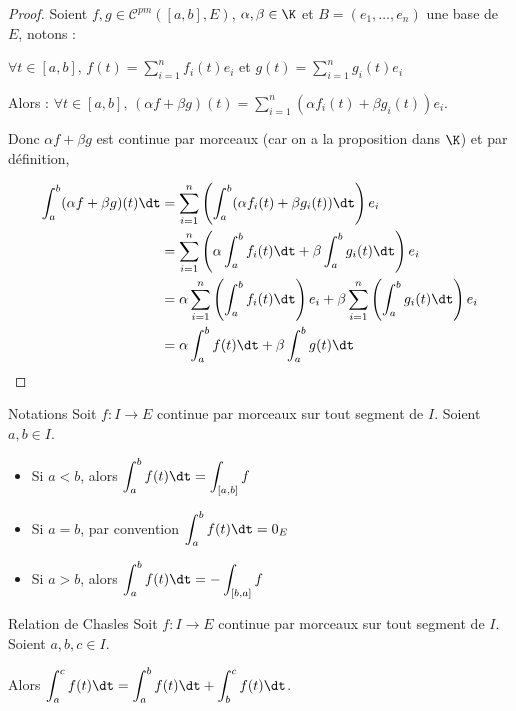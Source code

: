 \begin{proof}
    Soient $f,g \in \mathscr C^{pm}([a,b],E)$, $\alpha,\beta \in \K$ et $B = (e_1, \ldots, e_n)$ une base de $E$, notons :
    
    $\displaystyle \forall t \in [a, b], \, f(t) = \sum_{i=1}^n f_i(t)e_i$ et
    $\displaystyle g(t) = \sum_{i=1}^n g_i(t)e_i$
    
    Alors :
    $\displaystyle \forall t \in [a, b], \, (\alpha f + \beta g)(t) = \sum_{i=1}^n (\alpha f_i(t) + \beta g_i(t))e_i$.

    Donc $\alpha f + \beta g$ est continue par morceaux (car on a la proposition dans $\K$) et par définition,

    \begin{align*}
        \int_a^b (\alpha f + \beta g)(t) \dt & = \sum_{i=1}^n \left( \int_a^b (\alpha f_i(t) + \beta g_i(t)) \dt \right) e_i\\
        & = \sum_{i=1}^n \left( \alpha \int_a^b f_i(t) \dt + \beta \int_a^b g_i(t) \dt \right) e_i\\
        & = \alpha \sum_{i=1}^n \left( \int_a^b f_i(t) \dt \right) e_i + \beta \sum_{i=1}^n \left( \int_a^b g_i(t) \dt \right) e_i\\
        & = \alpha \int_a^b f(t) \dt + \beta \int_a^b g(t) \dt
    \end{align*}
\end{proof}

\begin{proposition}{Notations}{}
    Soit $f : I \to E$ continue par morceaux sur tout segment de $I$. Soient $a, b \in I$.
    \begin{itemize}
        \item Si $a < b$, alors $\displaystyle \int_a^b f(t) \dt = \int_{[a, b]} f$
        \item Si $a = b$, par convention $\displaystyle \int_a^b f(t) \dt = 0_E$
        \item Si $a > b$, alors $\displaystyle \int_a^b f(t) \dt = - \int_{[b, a]} f$
    \end{itemize}
\end{proposition}

\begin{proposition}{Relation de Chasles}{}
    Soit $f : I \to E$ continue par morceaux sur tout segment de $I$. Soient $a, b, c \in I$.

    Alors $\displaystyle \int_a^c f(t) \dt = \int_a^b f(t) \dt + \int_b^c f(t) \dt$.
\end{proposition}

